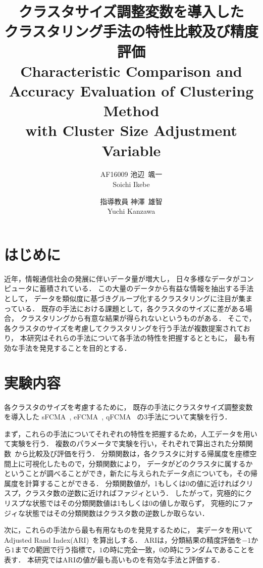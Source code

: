 \documentclass[twocolumn, a4paper]{icethesisabst}
\title{{\bf クラスタサイズ調整変数を導入した \\ クラスタリング手法の特性比較及び精度評価}
  {\normalsize \\ Characteristic Comparison and Accuracy Evaluation of Clustering Method \\ with Cluster Size Adjustment Variable}}
\author{
    AF16009 池辺~颯一 \\ Soichi Ikebe \and
    指導教員 神澤~雄智 \\ Yuchi Kanzawa
  }
\begin{document}
\maketitle


\section{はじめに}
近年，情報通信社会の発展に伴いデータ量が増大し，
日々多様なデータがコンピュータに蓄積されている．
この大量のデータから有益な情報を抽出する手法として，
データを類似度に基づきグループ化するクラスタリングに注目が集まっている．
既存の手法における課題として，各クラスタのサイズに差がある場合，
クラスタリングから有意な結果が得られないというものがある．
そこで，各クラスタのサイズを考慮してクラスタリングを行う手法が複数提案されており，
本研究はそれらの手法について各手法の特性を把握するとともに，
最も有効な手法を発見することを目的とする．


\section{実験内容}
各クラスタのサイズを考慮するために，
既存の手法にクラスタサイズ調整変数を導入した
sFCMA~\cite{sFCMA}, eFCMA~\cite{eFCMA}, qFCMA~\cite{qFCMA}
の3手法について実験を行う．

まず，これらの手法についてそれぞれの特性を把握するため，人工データを用いて実験を行う．
複数のパラメータで実験を行い，それぞれで算出された分類関数~\cite{cFunc}から比較及び評価を行う．
分類関数は，各クラスタに対する帰属度を座標空間上に可視化したもので，分類関数により，
データがどのクラスタに属するかということが調べることができ，新たに与えられたデータ点についても，その帰属度を計算することができる．
分類関数値が，1もしくは0の値に近ければクリスプ，クラスタ数の逆数に近ければファジィという．
したがって，究極的にクリスプな状態ではその分類関数値は1もしくは0の値しか取らず，
究極的にファジィな状態ではその分類関数はクラスタ数の逆数しか取らない．

次に，これらの手法から最も有用なものを発見するために，
実データを用いてAdjusted Rand Index(ARI)~\cite{ARI}を算出しする．
ARIは，分類結果の精度評価を$-1$から$1$までの範囲で行う指標で，$1$の時に完全一致，$0$の時にランダムであることを表す．
本研究ではARIの値が最も高いものを有効な手法と評価する．
\end{document}
